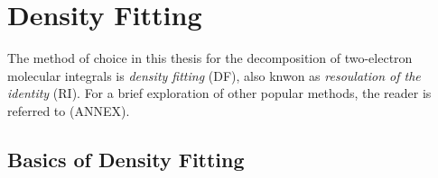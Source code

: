 



\FloatBarrier

\section{Density Fitting}

The method of choice in this thesis for the decomposition of two-electron molecular integrals is \emph{density fitting} (DF), also knwon as \emph{resoulation of the identity} (RI). For a brief exploration of other popular methods, the reader is referred to (ANNEX).  

\subsection{Basics of Density Fitting}

